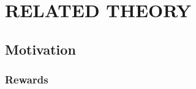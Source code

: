 \chapter{RELATED THEORY}
\setlength{\belowdisplayskip}{4pt} 
\section{Motivation}
\subsection{Rewards}
